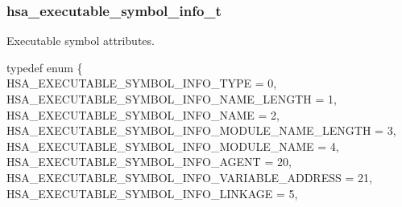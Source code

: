 \documentclass[final,oneside]{book}
\newcommand{\reftyp}[1]{#1}
\newcommand{\refenu}[1]{\reftyp{#1}}
\newenvironment{mylongtable}{\rowcolors{0}{lightgray}{lightgray}\longtable} {
\endlongtable}
\begin{document}
\vspace{-2mm} 


\subsubsection{hsa_\-executable_\-symbol_\-info_\-t}
\vspace{-2.5mm}Executable symbol attributes.\begin{mylongtable}{@{}p{\textwidth}}
\rule{0pt}{3ex}typedef enum \{\\\hspace{1.7em}\hypertarget{group__executable_1gga27e2e3a930764e3e7385e1ceded09706a72af1d4b40a2365ec0b3ef5aa5d8cb85}{\refenu{HSA_\-EXECUTABLE_\-SYMBOL_\-INFO_\-TYPE}} = 0,\\
\hspace{1.7em}\hypertarget{group__executable_1gga27e2e3a930764e3e7385e1ceded09706a27b71c171231a26f8c4d27fdfc57dc0a}{\refenu{HSA_\-EXECUTABLE_\-SYMBOL_\-INFO_\-NAME_\-LENGTH}} = 1,\\
\hspace{1.7em}\hypertarget{group__executable_1gga27e2e3a930764e3e7385e1ceded09706a92fd9813235a13632416965b571e2390}{\refenu{HSA_\-EXECUTABLE_\-SYMBOL_\-INFO_\-NAME}} = 2,\\
\hspace{1.7em}\hypertarget{group__executable_1gga27e2e3a930764e3e7385e1ceded09706a03bb272117f412f9a97f6f69a40193c3}{\refenu{HSA_\-EXECUTABLE_\-SYMBOL_\-INFO_\-MODULE_\-NAME_\-LENGTH}} = 3,\\
\hspace{1.7em}\hypertarget{group__executable_1gga27e2e3a930764e3e7385e1ceded09706a0590dba27afbccac9dd8148bf3bf3d03}{\refenu{HSA_\-EXECUTABLE_\-SYMBOL_\-INFO_\-MODULE_\-NAME}} = 4,\\
\hspace{1.7em}\hypertarget{group__executable_1gga27e2e3a930764e3e7385e1ceded09706a47f3db73bd7a19127a9827c976879fee}{\refenu{HSA_\-EXECUTABLE_\-SYMBOL_\-INFO_\-AGENT}} = 20,\\
\hspace{1.7em}\hypertarget{group__executable_1gga27e2e3a930764e3e7385e1ceded09706abbcb6d61e423c9726f1dc6beae08a045}{\refenu{HSA_\-EXECUTABLE_\-SYMBOL_\-INFO_\-VARIABLE_\-ADDRESS}} = 21,\\
\hspace{1.7em}\hypertarget{group__executable_1gga27e2e3a930764e3e7385e1ceded09706ace25531535ed03bd77910d00eb5169a4}{\refenu{HSA_\-EXECUTABLE_\-SYMBOL_\-INFO_\-LINKAGE}} = 5,\\

\end{mylongtable}
\end{document}
